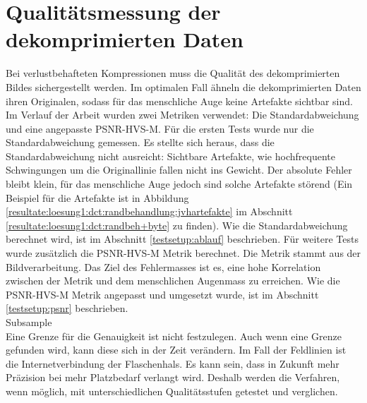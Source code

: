 \section{Qualitätsmessung der dekomprimierten Daten}
Bei verlustbehafteten Kompressionen muss die Qualität des dekomprimierten Bildes sichergestellt werden. Im optimalen Fall ähneln die dekomprimierten Daten ihren Originalen, sodass für das menschliche Auge keine Artefakte sichtbar sind.\\
Im Verlauf der Arbeit wurden zwei Metriken verwendet: Die Standardabweichung und eine angepasste PSNR-HVS-M. Für die ersten Tests wurde nur die Standardabweichung gemessen. Es stellte sich heraus, dass die Standardabweichung nicht ausreicht: Sichtbare Artefakte, wie hochfrequente Schwingungen um die Originallinie fallen nicht ins Gewicht. Der absolute Fehler bleibt klein, für das menschliche Auge jedoch sind solche Artefakte störend (Ein Beispiel für die Artefakte ist in Abbildung \ref{resultate:loesung1:dct:randbehandlung:jvhartefakte} im Abschnitt \ref{resultate:loesung1:dct:randbeh+byte} zu finden). Wie die Standardabweichung berechnet wird, ist im Abschnitt \ref{testsetup:ablauf} beschrieben. Für weitere Tests wurde zusätzlich die PSNR-HVS-M Metrik berechnet. Die Metrik stammt aus der Bildverarbeitung. Das Ziel des Fehlermasses ist es, eine hohe Korrelation zwischen der Metrik und dem menschlichen Augenmass zu erreichen. Wie die PSNR-HVS-M Metrik angepasst und umgesetzt wurde, ist im Abschnitt \ref{testsetup:psnr} beschrieben.\\
[\baselineskip]
Subsample\\
[\baselineskip]
Eine Grenze für die Genauigkeit ist nicht festzulegen. Auch wenn eine Grenze gefunden wird, kann diese sich in der Zeit verändern. Im Fall der Feldlinien ist die Internetverbindung der Flaschenhals. Es kann sein, dass in Zukunft mehr Präzision bei mehr Platzbedarf verlangt wird. Deshalb werden die Verfahren, wenn möglich, mit unterschiedlichen Qualitätsstufen getestet und verglichen.

